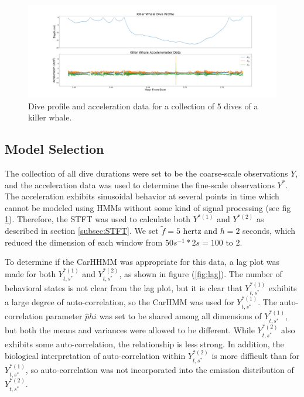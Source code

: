 \begin{figure}[ht]
	\centering
	\includegraphics[width=5in]{../Plots/raw_data_5_dives.png}
	\caption{Dive profile and acceleration data for a collection of 5 dives of a killer whale.}
	\label{fig:data_one_dive}
\end{figure}

\subsection{Model Selection}

The collection of all dive durations were set to be the coarse-scale observations $Y$, and the acceleration data was used to determine the fine-scale observations $Y^*$. The acceleration exhibits sinusoidal behavior at several points in time which cannot be modeled using HMMs without some kind of signal processing (see fig \ref{fig:data_one_dive}). Therefore, the STFT was used to calculate both $Y^{*(1)}$ and $Y^{*(2)}$ as described in section \ref{subsec:STFT}. We set $\tilde{f} = 5$ hertz and $h = 2$ seconds, which reduced the dimension of each window from $50 s^{-1} * 2 s = 100$ to $2$.

To determine if the CarHHMM was appropriate for this data, a lag plot was made for both $Y^{*(1)}_{t,s^*}$ and $Y^{*(2)}_{t,s^*}$, as shown in figure (\ref{fig:lag}). The number of behavioral states is not clear from the lag plot, but it is clear that $Y^{*(1)}_{t,s^*}$ exhibits a large degree of auto-correlation, so the CarHMM was used for $Y^{*(1)}_{t,s^*}$. The auto-correlation parameter $\hat phi$ was set to be shared among all dimensions of $Y^{*(1)}_{t,s^*}$, but both the means and variances were allowed to be different. While $Y^{*(2)}_{t,s^*}$ also exhibits some auto-correlation, the relationship is less strong. In addition, the biological interpretation of auto-correlation within $Y^{*(2)}_{t,s^*}$ is more difficult than for $Y^{*(1)}_{t,s^*}$, so auto-correlation was not incorporated into the emission distribution of $Y^{*(2)}_{t,s^*}$.

